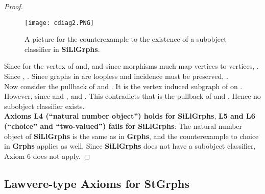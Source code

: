 \documentclass[11pt]{article}
\begin{document}
\begin{proof}
\begin{figure}[h]
\centering \texttt{[image: cdiag2.PNG]}
\caption{A picture for the counterexample to the existence of a subobject classifier in \textbf{SiLlGrphs}.}
\end{figure}\par
Since  for  the vertex of  and, and since morphisms much map vertices to vertices, . Since , . Since graphs in  are loopless and incidence must be preserved, .\\
\indent Now consider the pullback of  and . It is the vertex induced subgraph of  on . However, since  and ,  and . This contradicts that  is the pullback of  and . Hence no subobject classifier exists.\\
\indent \textbf{Axioms L4 (``natural number object'') holds for } \textbf{SiLlGrphs}, \textbf{L5 and L6 (``choice'' and ``two-valued'') fails for} \textbf{SiLlGrphs}: The natural number object of \textbf{SiLlGrphs} is the same as in \textbf{Grphs}, and the counterexample to choice in \textbf{Grphs} applies as well. Since \textbf{SiLlGrphs} does not have a subobject classifier, Axiom 6 does not apply.
\end{proof}

\subsection{Lawvere-type Axioms for \textbf{StGrphs}}
\end{document}
